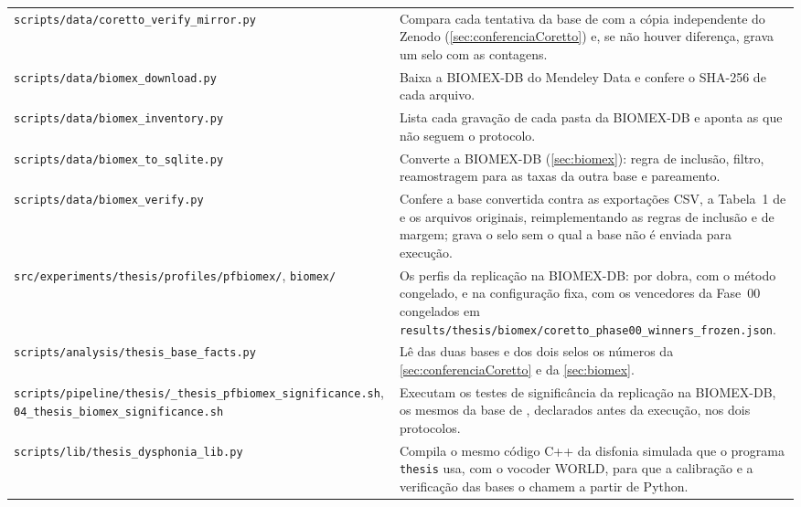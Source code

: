 \begin{apendicesenv}
{\begin{longtable}{@{}Y{0.30\textwidth}Y{0.64\textwidth}@{}}
			\raggedright\texttt{scripts/\allowbreak data/\allowbreak coretto\_verify\_\allowbreak mirror.py} & Compara cada tentativa da base de  com a cópia independente do Zenodo (\autoref{sec:conferenciaCoretto}) e, se não houver diferença, grava um selo com as contagens. \\
			\raggedright\texttt{scripts/\allowbreak data/\allowbreak biomex\_\allowbreak download.py} & Baixa a BIOMEX-DB do Mendeley Data e confere o SHA-256 de cada arquivo. \\
			\raggedright\texttt{scripts/\allowbreak data/\allowbreak biomex\_\allowbreak inventory.py} & Lista cada gravação de cada pasta da BIOMEX-DB e aponta as que não seguem o protocolo. \\
			\raggedright\texttt{scripts/\allowbreak data/\allowbreak biomex\_\allowbreak to\_\allowbreak sqlite.py} & Converte a BIOMEX-DB (\autoref{sec:biomex}): regra de inclusão, filtro, reamostragem para as taxas da outra base e pareamento. \\
			\raggedright\texttt{scripts/\allowbreak data/\allowbreak biomex\_\allowbreak verify.py} & Confere a base convertida contra as exportações CSV, a Tabela~1 de  e os arquivos originais, reimplementando as regras de inclusão e de margem; grava o selo sem o qual a base não é enviada para execução. \\
			\raggedright\texttt{src/\allowbreak experiments/\allowbreak thesis/\allowbreak profiles/\allowbreak pfbiomex/}, \texttt{biomex/} & Os perfis da replicação na BIOMEX-DB: por dobra, com o método congelado, e na configuração fixa, com os vencedores da Fase~00 congelados em \texttt{results/\allowbreak thesis/\allowbreak biomex/\allowbreak coretto\_\allowbreak phase00\_\allowbreak winners\_\allowbreak frozen.json}. \\
			\raggedright\texttt{scripts/\allowbreak analysis/\allowbreak thesis\_base\_\allowbreak facts.py} & Lê das duas bases e dos dois selos os números da \autoref{sec:conferenciaCoretto} e da \autoref{sec:biomex}. \\
			\raggedright\texttt{scripts/\allowbreak pipeline/\allowbreak thesis/\_thesis\_\allowbreak pfbiomex\_\allowbreak significance.sh}, \texttt{04\_thesis\_\allowbreak biomex\_\allowbreak significance.sh} & Executam os testes de significância da replicação na BIOMEX-DB, os mesmos da base de , declarados antes da execução, nos dois protocolos. \\
			\raggedright\texttt{scripts/\allowbreak lib/\allowbreak thesis\_\allowbreak dysphonia\_\allowbreak lib.py} & Compila o mesmo código C++ da disfonia simulada que o programa \texttt{thesis} usa, com o vocoder WORLD, para que a calibração e a verificação das bases o chamem a partir de Python. \\

\end{longtable}}
\end{apendicesenv}
